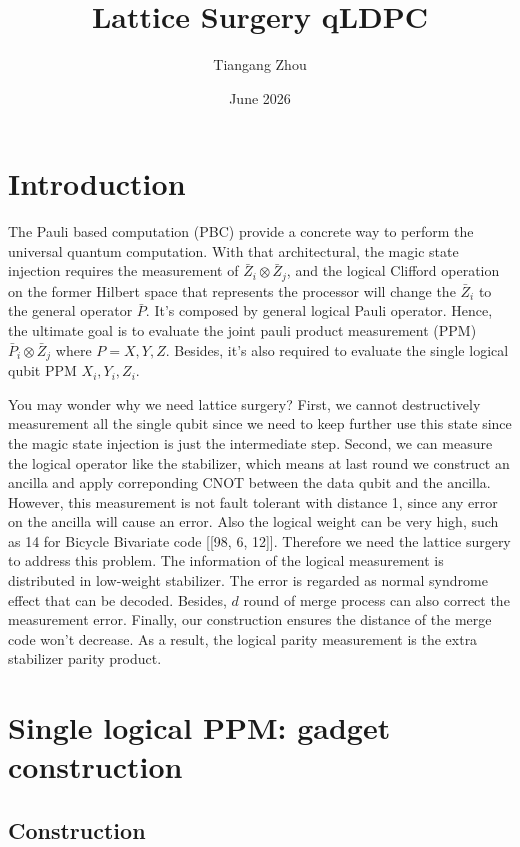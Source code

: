 \documentclass[a4paper, 12pt]{article}
\title{Lattice Surgery qLDPC}
\author{Tiangang Zhou}
\date{June 2026}
\begin{document}
\maketitle

\section{Introduction}

The Pauli based computation (PBC) provide a concrete way to perform the universal quantum computation. With that architectural, the magic state injection requires the measurement of $\bar{Z}_i \otimes \bar{Z}_j$, and the logical Clifford operation on the former Hilbert space that represents the processor will change the $\bar{Z}_i $ to the general operator $\bar{P}$. It's composed by general logical Pauli operator. Hence, the ultimate goal is to evaluate the joint pauli product measurement (PPM) $\bar{P}_i \otimes \bar{Z}_j$ where $P = X, Y, Z$. Besides, it's also required to evaluate the single logical qubit PPM $X_i, Y_i, Z_i$.

You may wonder why we need lattice surgery? First, we cannot destructively measurement all the single qubit since we need to keep further use this state since the magic state injection is just the intermediate step. Second, we can measure the logical operator like the stabilizer, which means at last round we construct an ancilla and apply correponding CNOT between the data qubit and the ancilla. However, this measurement is not fault tolerant with distance 1, since any error on the ancilla will cause an error. Also the logical weight can be very high, such as 14 for Bicycle Bivariate code [[98, 6, 12]]. Therefore we need the lattice surgery to address this problem. The information of the logical measurement is distributed in low-weight stabilizer. The error is regarded as normal syndrome effect that can be decoded. Besides, $d$ round of merge process can also correct the measurement error. Finally, our construction ensures the distance of the merge code won't decrease. As a result, the logical parity measurement is the extra stabilizer parity product.

\section{Single logical PPM: gadget construction}
\subsection{Construction}
\end{document}
